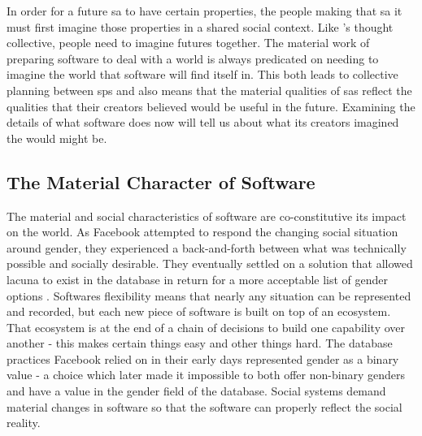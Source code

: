 \documentclass[a4paper,man,natbib,floatsintext]{apa6}
\begin{document}
  In order for a future \gls{sa} to have certain properties, the people making that \gls{sa} it must first imagine those properties in a shared social context. Like \citet{Fleck2012-qr}'s thought collective, people need to imagine futures together. The material work of preparing software to deal with a world is always predicated on needing to imagine the world that software will find itself in. This both leads to collective planning between \glspl{sp} and also means that the material qualities of \glspl{sa} reflect the qualities that their creators believed would be useful in the future. Examining the details of what software does now will tell us about what its creators imagined the would might be.

  
  \subsection{The Material Character of Software}
  The material and social characteristics of software are co-constitutive its impact on the world. As Facebook attempted to respond the changing social situation around gender, they experienced a back-and-forth between what was technically possible and socially desirable. They eventually settled on a solution that allowed lacuna to exist in the database in return for a more acceptable list of gender options \citep{Bivens2017-tc}. Softwares flexibility means that nearly any situation can be represented and recorded, but each new piece of software is built on top of an ecosystem. That ecosystem is at the end of a chain of decisions to build one capability over another - this makes certain things easy and other things hard. The database practices Facebook relied on in their early days represented gender as a binary value - a choice which later made it impossible to both offer non-binary genders and have a value in the gender field of the database. Social systems demand material changes in software so that the software can properly reflect the social reality.
\end{document}
